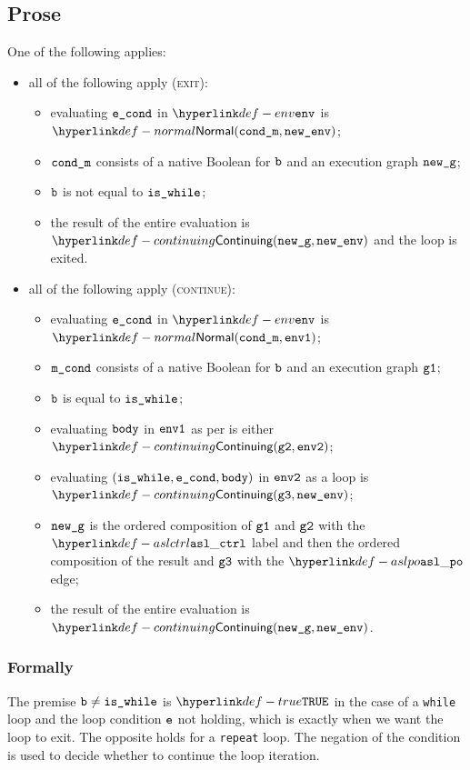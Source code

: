 \subsection{Prose}
One of the following applies:
\begin{itemize}
\item all of the following apply (\textsc{exit}):
  \begin{itemize}
    \item evaluating $\texttt{e\_cond}$ in $\env$ is $\Normal(\condm, \newenv)$\ProseOrAbnormal;
    \item $\texttt{cond\_m}$ consists of a native Boolean for $\texttt{b}$ and an execution graph $\texttt{new\_g}$;
    \item $\texttt{b}$ is not equal to $\texttt{is\_while}$;
    \item the result of the entire evaluation is $\Continuing(\newg, \newenv)$
    and the loop is exited.
  \end{itemize}
\item all of the following apply (\textsc{continue}):
  \begin{itemize}
    \item evaluating $\texttt{e\_cond}$ in $\env$ is $\Normal(\condm, \envone)$;
    \item $\texttt{m\_cond}$ consists of a native Boolean for $\texttt{b}$ and an execution graph $\texttt{g1}$;
    \item $\texttt{b}$ is equal to $\texttt{is\_while}$;
    \item evaluating $\texttt{body}$ in $\texttt{env1}$ as per  is either \\
    $\Continuing(\vgtwo, \envtwo)$\ProseTerminateAs{\ReturningConfig, \ThrowingConfig, \DynErrorConfig};
    \item evaluating $(\texttt{is\_while}, \texttt{e\_cond}, \texttt{body})$ in $\texttt{env2}$ as a loop is \\
    $\Continuing(\vgthree, \newenv)$\ProseTerminateAs{\ReturningConfig, \ThrowingConfig, \DynErrorConfig};
    \item $\texttt{new\_g}$ is the ordered composition of $\texttt{g1}$ and $\texttt{g2}$ with the $\aslctrl$ label
    and then the ordered composition of the result and $\texttt{g3}$ with the $\aslpo$ edge;
    \item the result of the entire evaluation is $\Continuing(\newg, \newenv)$.
  \end{itemize}
\end{itemize}

\subsubsection{Formally}
The premise $\texttt{b} \neq \texttt{is\_while}$ is $\True$ in the case of a \texttt{while} loop
and the loop condition $\texttt{e}$ not holding, which is exactly when we want the
loop to exit. The opposite holds for a \texttt{repeat} loop.
The negation of the condition is used to decide whether to continue the loop iteration.

